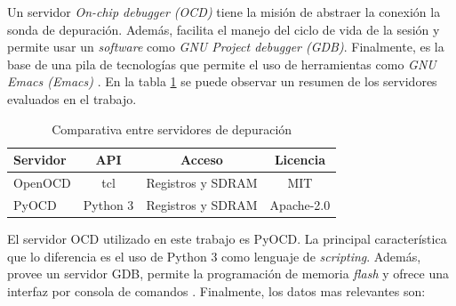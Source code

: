 Un servidor \emph{On-chip debugger (OCD)} tiene la misión de abstraer la conexión la sonda de depuración.
Además, facilita el manejo del ciclo de vida de la sesión y permite usar un \emph{software} como \emph{GNU Project debugger (GDB)}.
Finalmente, es la base de una pila de tecnologías que permite el uso de herramientas como \emph{GNU Emacs (Emacs)} \citep{BOOK:gdb}.
En la tabla \ref{tab:servidores} se puede observar un resumen de los servidores evaluados en el trabajo.

\begin{table}[h]
	\centering
	\caption[Servidores de depuración]{Comparativa entre servidores de depuración}
	\begin{tabular}{l c c c}    
		\toprule
        \textbf{Servidor} & \textbf{API} & \textbf{Acceso}   & \textbf{Licencia}\\
		\midrule
        OpenOCD           & tcl                         & Registros y SDRAM & MIT\\        	
        PyOCD             & Python 3                    & Registros y SDRAM & Apache-2.0\\
		\bottomrule
		\hline
	\end{tabular}
	\label{tab:servidores}
\end{table}

El servidor OCD utilizado en este trabajo es PyOCD.
La principal característica que lo diferencia es el uso de Python 3 como lenguaje de \emph{scripting}.
Además, provee un servidor GDB, permite la programación de memoria \emph{flash} y ofrece una interfaz por consola de comandos \citep{WEBSITE:pyocd}.
Finalmente, los datos mas relevantes son:

